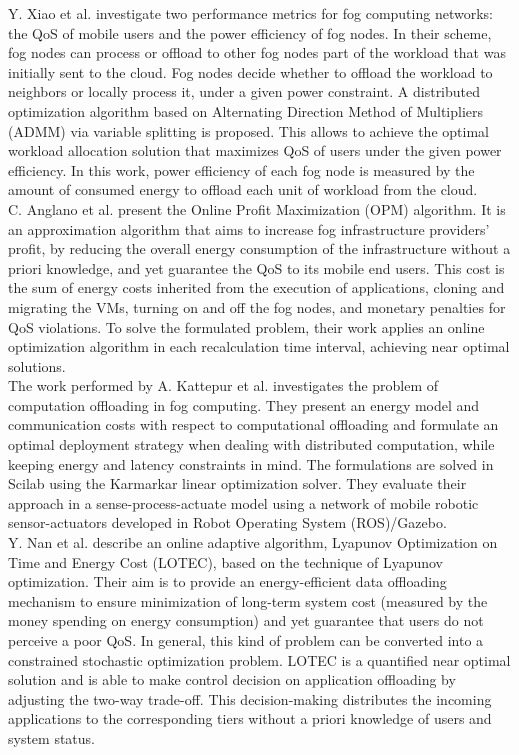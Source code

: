 \noindent\tab Y. Xiao et al. \cite{xiao2017qoe} investigate two performance metrics for fog computing networks: the QoS of mobile users and the power efficiency of fog nodes. In their scheme, fog nodes can process or offload to other fog nodes part of the workload that was initially sent to the cloud. Fog nodes decide whether to offload the workload to neighbors or locally process it, under a given power constraint. A distributed optimization algorithm based on Alternating Direction Method of Multipliers (ADMM) via variable splitting is proposed. This allows to achieve the optimal workload allocation solution that maximizes QoS of users under the given power efficiency. In this work, power efficiency of each fog node is measured by the amount of consumed energy to offload each unit of workload from the cloud.\\
\noindent\tab C. Anglano et al. \cite{anglano2018profit} present the Online Profit Maximization (OPM) algorithm. It is an approximation algorithm that aims to increase fog infrastructure providers' profit, by reducing the overall energy consumption of the infrastructure without a priori knowledge, and yet guarantee the QoS to its mobile end users. This cost is the sum of energy costs inherited from the execution of applications, cloning and migrating the VMs, turning on and off the fog nodes, and monetary penalties for QoS violations. To solve the formulated problem, their work applies an online optimization algorithm in each recalculation time interval, achieving near optimal solutions.\\
\noindent\tab The work performed by A. Kattepur et al. \cite{kattepur2016resource} investigates the problem of computation offloading in fog computing. They present an energy model and communication costs with respect to computational offloading and formulate an optimal deployment strategy when dealing with distributed computation, while keeping energy and latency constraints in mind. The formulations are solved in Scilab using the Karmarkar linear optimization solver. They evaluate their approach in a sense-process-actuate model using a network of mobile robotic sensor-actuators developed in Robot Operating System (ROS)/Gazebo.\\
\noindent\tab Y. Nan et al. \cite{nan2017adaptive} describe an online adaptive algorithm, Lyapunov Optimization on Time and Energy Cost (LOTEC), based on the technique of Lyapunov optimization. Their aim is to provide an energy-efficient data offloading mechanism to ensure minimization of long-term system cost (measured by the money spending on energy consumption) and yet guarantee that users do not perceive a poor QoS. In general, this kind of problem can be converted into a constrained stochastic optimization problem. LOTEC is a quantified near optimal solution and is able to make control decision on application offloading by adjusting the two-way trade-off. This decision-making distributes the incoming applications to the corresponding tiers without a priori knowledge of users and system status.
